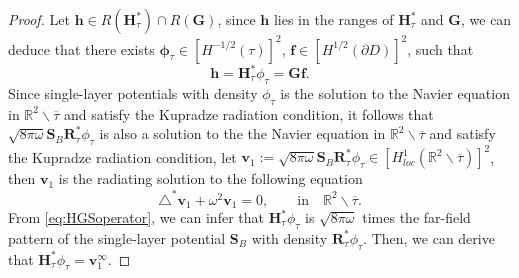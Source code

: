 \documentclass[11pt,reqno,twoside]{amsart}
\theoremstyle{definition}
\theoremstyle{remark}
\numberwithin{equation}{section}
\begin{document}
	\begin{proof}
	Let $\mathbf h \in 	R\left( \mathbf H^*_{\tau} \right) \cap R\left( \mathbf G\right)$, since $\mathbf h$ lies in the ranges of $\mathbf H^*_{\tau}$ and $\mathbf G$, we can deduce that there exists $\mathbf{\phi} _{\tau} \in \left[H^{-1/2} \left(\tau \right) \right] ^2$, $\mathbf f \in \left[H^{1/2}\left(\partial D\right) \right] ^2$, such that
	$$
	\mathbf h= \mathbf H^*_{\tau} \phi _{\tau}= \mathbf G \mathbf f.
	$$
	Since single-layer potentials with density $\phi _{\tau}$ is the solution to the Navier equation in $\mathbb R^2 \backslash \overline{\tau}$ and satisfy the Kupradze radiation condition, it follows that $\sqrt{8\pi\omega} \mathbf S_B \mathbf R^*_{\tau} \phi _{\tau}$ is also a solution to the  the Navier equation in $\mathbb R^2 \backslash \overline{\tau}$ and satisfy the Kupradze radiation condition, let $\mathbf v _1:= \sqrt{8\pi\omega} \mathbf S_B \mathbf R^*_{\tau} \phi _{\tau} \in \left[ H^1_{loc} \left( \mathbb R^2 \backslash \overline{\tau} \right) \right] ^2$, then $\mathbf v _1$ is the radiating solution to the following equation
	\begin{equation}
			\triangle ^* \mathbf v _1 + \omega ^2 \mathbf v _1 =0,\qquad \mbox{in}\quad \mathbb R^2 \backslash \overline{\tau}.
	\end{equation}
	From \eqref{eq:HGSoperator}, we can infer that $\mathbf H^*_{\tau} \phi _{\tau}$ is $\sqrt{8\pi\omega}$ times the far-field pattern of the single-layer potential $\mathbf S_B$ with density $\mathbf R^*_{\tau} \phi _{\tau}$. Then, we can derive that $\mathbf H^*_{\tau} \phi _{\tau}= \mathbf v^{\infty} _1$. 
	

\end{proof}
\end{document}
